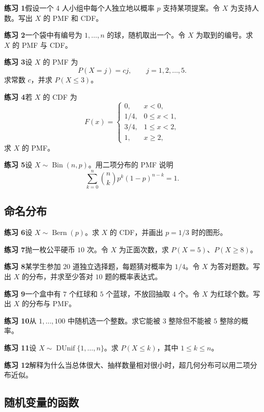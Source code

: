 \documentclass[UTF8, 12pt, fontset=fandol, oneside]{ctexart}
\begin{document}
\noindent\textbf{练习 1}\quad 假设一个 4 人小组中每个人独立地以概率 $p$ 支持某项提案。令 $X$ 为支持人数。写出 $X$ 的 PMF 和 CDF。

\noindent\textbf{练习 2}\quad 一个袋中有编号为 $1,\ldots,n$ 的球，随机取出一个。令 $X$ 为取到的编号。求 $X$ 的 PMF 与 CDF。

\noindent\textbf{练习 3}\quad 设 $X$ 的 PMF 为
\[
  P(X=j)=cj,\qquad j=1,2,\ldots,5.
\]
求常数 $c$，并求 $P(X\le 3)$。

\noindent\textbf{练习 4}\quad 若 $X$ 的 CDF 为
\[
  F(x)=
  \begin{cases}
    0,&x<0,\\
    1/4,&0\le x<1,\\
    3/4,&1\le x<2,\\
    1,&x\ge 2,
  \end{cases}
\]
求 $X$ 的 PMF。

\noindent\textbf{练习 5}\quad 设 $X\sim\operatorname{Bin}(n,p)$。用二项分布的 PMF 说明
\[
  \sum_{k=0}^n \binom{n}{k}p^k(1-p)^{n-k}=1.
\]

\subsection*{命名分布}

\noindent\textbf{练习 6}\quad 设 $X\sim\operatorname{Bern}(p)$。求 $X$ 的 CDF，并画出 $p=1/3$ 时的图形。

\noindent\textbf{练习 7}\quad 抛一枚公平硬币 $10$ 次。令 $X$ 为正面次数，求 $P(X=5)$、$P(X\ge 8)$。

\noindent\textbf{练习 8}\quad 某学生参加 $20$ 道独立选择题，每题猜对概率为 $1/4$。令 $X$ 为答对题数。写出 $X$ 的分布，并求至少答对 $10$ 题的概率表达式。

\noindent\textbf{练习 9}\quad 一个盒中有 $7$ 个红球和 $5$ 个蓝球，不放回抽取 $4$ 个。令 $X$ 为红球个数。写出 $X$ 的分布与 PMF。

\noindent\textbf{练习 10}\quad 从 $1,\ldots,100$ 中随机选一个整数。求它能被 $3$ 整除但不能被 $5$ 整除的概率。

\noindent\textbf{练习 11}\quad 设 $X\sim\operatorname{DUnif}\{1,\ldots,n\}$。求 $P(X\le k)$，其中 $1\le k\le n$。

\noindent\textbf{练习 12}\quad 解释为什么当总体很大、抽样数量相对很小时，超几何分布可以用二项分布近似。

\subsection*{随机变量的函数}
\end{document}
